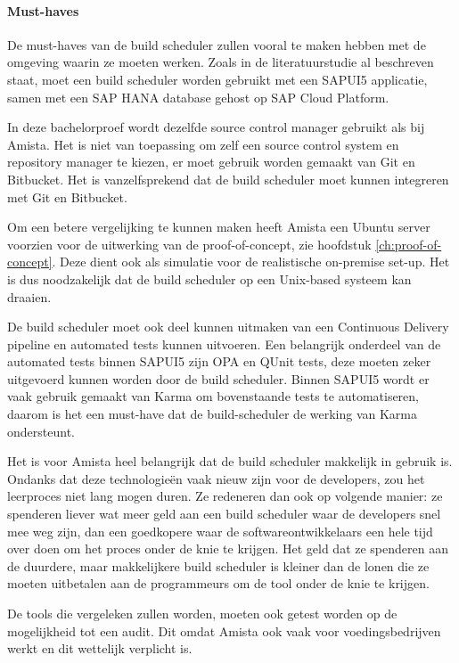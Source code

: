             \paragraph{Must-haves}
            De must-haves van de build scheduler zullen vooral te maken hebben met de omgeving waarin ze moeten werken. Zoals in de literatuurstudie al beschreven staat, moet een build scheduler worden gebruikt met een SAPUI5 applicatie, samen met een SAP HANA database gehost op SAP Cloud Platform.
            
            In deze bachelorproef wordt dezelfde source control manager gebruikt als bij Amista. Het is niet van toepassing om zelf een source control system en repository manager te kiezen, er moet gebruik worden gemaakt van Git en Bitbucket. Het is vanzelfsprekend dat de build scheduler moet kunnen integreren met Git en Bitbucket.

            Om een betere vergelijking te kunnen maken heeft Amista een Ubuntu server voorzien voor de uitwerking van de proof-of-concept, zie hoofdstuk \ref{ch:proof-of-concept}. Deze dient ook als simulatie voor de realistische on-premise set-up. Het is dus noodzakelijk dat de build scheduler op een Unix-based systeem kan draaien.
            
            De build scheduler moet ook deel kunnen uitmaken van een Continuous Delivery pipeline en automated tests kunnen uitvoeren. Een belangrijk onderdeel van de automated tests binnen SAPUI5 zijn OPA en QUnit  tests, deze moeten zeker uitgevoerd kunnen worden door de build scheduler.
            Binnen SAPUI5 wordt er vaak gebruik gemaakt van Karma om bovenstaande tests te automatiseren, daarom is het een must-have dat de build-scheduler de werking van Karma ondersteunt.
            
            Het is voor Amista heel belangrijk dat de build scheduler makkelijk in gebruik is. Ondanks dat deze technologieën vaak nieuw zijn voor de developers, zou het leerproces niet lang mogen duren. Ze redeneren dan ook op volgende manier: ze spenderen liever wat meer geld aan een build scheduler waar de developers snel mee weg zijn, dan een goedkopere waar de softwareontwikkelaars een hele tijd over doen om het proces onder de knie te krijgen. Het geld dat ze spenderen aan de duurdere, maar makkelijkere build scheduler is kleiner dan de lonen die ze moeten uitbetalen aan de programmeurs om de tool onder de knie te krijgen.
            
            De tools die vergeleken zullen worden, moeten ook getest worden op de mogelijkheid tot een audit. Dit omdat Amista ook vaak voor voedingsbedrijven werkt en dit wettelijk verplicht is.

